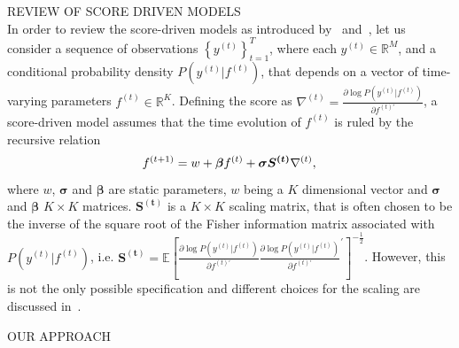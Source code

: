 \documentclass[a4paper,12pt]{article}
\newcommand{\tonde}[1]{\left(#1\right)}
\newcommand{\quadre}[1]{\left[#1\right]}
\newcommand{\graffe}[1]{\left\{#1\right\}}
\newcommand{\be}{\begin{equation}}
\newcommand{\ee}{\end{equation}}
\newcommand{\et}{^{\tonde{t}}}
\newcommand{\etprime}{^{\tonde{t}\prime}}
\newcommand{\etp}{^{\tonde{t+1}}}
\begin{document}
REVIEW OF SCORE DRIVEN MODELS\\

In order to review the score-driven models as introduced by~\cite{creal2013generalized} and~\cite{harvey_2013}, let us consider a sequence of observations $\graffe{y\et}_{t=1}^T$, where each $y\et \in\mathbb{R}^M$,  and a conditional probability density $P\tonde{y\et\vert f\et}$, that depends on a vector of time-varying parameters $f\et \in \mathbb{R}^K$. Defining the score as $\nabla\et = \frac{\partial \log{P\tonde{y\et\vert f\et}}}{\partial f\etprime}$, a score-driven model assumes that the time evolution of $f\et$ is ruled by the recursive relation
\be  \label{eq:gasupdaterule}
f\etp = w +\boldsymbol{\beta} f\et + \boldsymbol{\sigma} \boldsymbol{S\et} \nabla\et , \\
\ee 
where $w$, $\boldsymbol{\sigma}$ and $\boldsymbol{\beta}$ are static parameters, $w$ being a $K$ dimensional vector and $\boldsymbol{\sigma}$ and $\boldsymbol{\beta}$  $K\times K$ matrices.  $\boldsymbol{S\et}$ is a $K\times K$ scaling matrix, that is often chosen to be the inverse of the square root of the Fisher information matrix associated with $P\tonde{y\et\vert f\et}$, i.e. $\boldsymbol{S\et} = \mathbb{E}\quadre{\frac{\partial \log{P\tonde{y\et\vert f\et}}}{\partial f\etprime} \frac{\partial \log{P\tonde{y\et\vert f\et}}}{\partial f\etprime}^\prime }^{-\frac{1}{2}}$. However, this is not the only possible specification and different choices for the scaling are discussed in~\cite{creal2013generalized}.


OUR APPROACH\\
\end{document}
